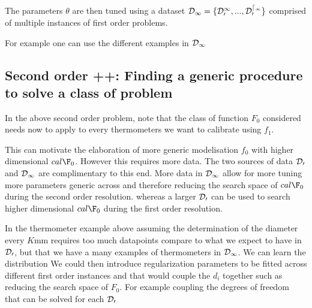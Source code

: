\begin{bibunit}
{{{{  The parameters $\theta$ are then tuned using a dataset $\cal{D}_1 = \{\cal{D}_0^1, ..., \cal{D}_0^{d_1}\}$ comprised of multiple instances of first order problems.

 For example one can use the different examples in  $\cal{D}_1$ 

%
%
  

\subsection{Second order ++: Finding a generic procedure to solve a class of problem}

In the above second order problem, note that the class of function $F_0$ considered needs now to apply to every thermometers we want to calibrate using $f_1$.

  This can motivate the elaboration of more generic modelisation $f_0$ with higher dimensional $cal{\F}_0$.
  However this requires more data.
  The two sources of data $\cal{D}_0$ and $\cal{D}_1$ are complimentary to this end.
  More data in $\cal{D}_1$ allow for more tuning more parameters generic across and therefore reducing the search space of $cal{\F}_0$ during the second order resolution.
  whereas a larger $\cal{D}_0$ can be used to search higher dimensional $cal{\F}_0$ during the first order resolution.

  In the thermometer example above assuming the determination of the diameter every $K$mm requires too much datapoints compare to what we expect to have in $\cal{D}_0$, but that we have a many examples of thermometers in $\cal{D}_1$.
  We can learn the distribution 
  We could then introduce regularization parameters to be fitted across different first order instances and that would couple the $d_i$ together such as reducing the search space of $F_0$.
  For example coupling the 
  degrees of freedom that can be solved for each $\cal{D}_0$


}}}}
\end{bibunit}
